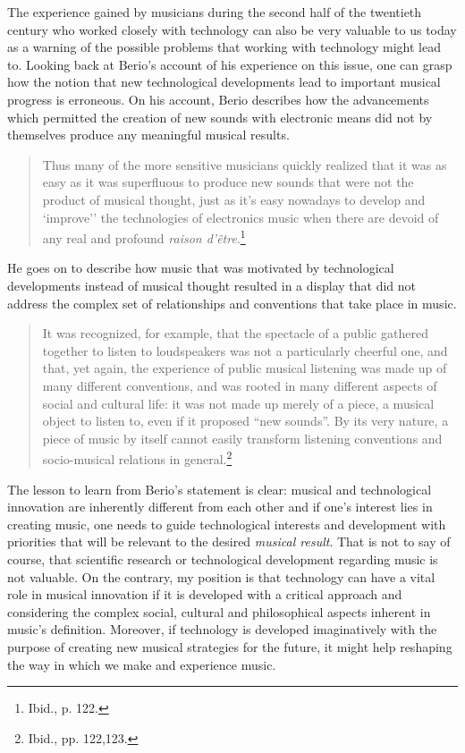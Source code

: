 The experience gained by musicians during the second half of the twentieth century who worked closely with technology can also be very valuable to us today as a warning of the possible problems that working with technology might lead to. Looking back at Berio's account of his experience on this issue, one can grasp how the notion that new technological developments lead to important musical progress is erroneous. On his account, Berio describes how the advancements which permitted the creation of new sounds with electronic means did not by themselves produce any meaningful musical results. 
\begin{quote}
Thus many of the more sensitive musicians quickly realized that it was as easy as it was superfluous to produce new sounds that were not the product of musical thought, just as it's easy nowadays to develop and `improve'' the technologies of electronics music when there are devoid of any real and profound \emph{raison d'\^{e}tre}.\footnote{Ibid., p. 122.}
\end{quote}
He goes on to describe how music that was motivated by technological developments instead of musical thought resulted in a display that did not address the complex set of relationships and conventions that take place in music.
\begin{quote}
It was recognized, for example, that the spectacle of a public gathered together to listen to loudspeakers was not a particularly cheerful one, and that, yet again, the experience of public musical listening was made up of many different conventions, and was rooted in many different aspects of social and cultural life: it was not made up merely of a piece, a musical object to listen to, even if it proposed ``new sounds''. By its very nature, a piece of music by itself cannot easily transform listening conventions and socio-musical relations in general.\footnote{Ibid., pp. 122,123.}
\end{quote}
The lesson to learn from Berio's statement is clear: musical and technological innovation are inherently different from each other and if one's interest lies in creating music, one needs to guide technological interests and development with priorities that will be relevant to the desired \emph{musical result}. That is not to say of course, that scientific research or technological development regarding music is not valuable. On the contrary, my position is that technology can have a vital role in musical innovation if it is developed with a critical approach and considering the complex social, cultural and philosophical aspects inherent in music's definition. Moreover, if technology is developed imaginatively with the purpose of creating new musical strategies for the future, it might help reshaping the way in which we make and experience music.

